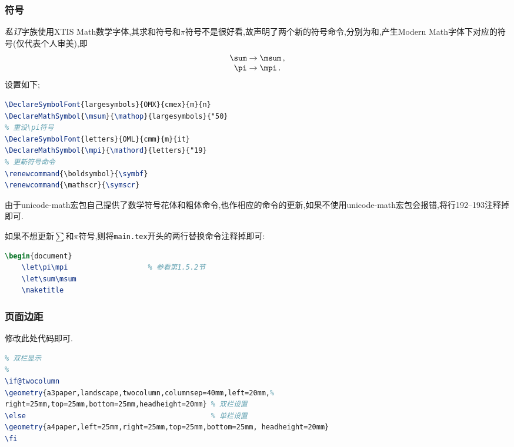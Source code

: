 \documentclass[list,answers,csize4,custom]{sysuexam}
\begin{document}
\subsubsection{符号}
\textit{私订}字族使用XTIS Math数学字体,其求和符号和$\pi$符号不是很好看,故声明了两个新的符号命令,分别为和,产生Modern Math字体下对应的符号(仅代表个人审美),即
$$
\begin{array}{c}
\sum \rightarrow \msum \,,\\
\pi  \rightarrow \mpi  \,.
\end{array}
$$
设置如下;

\begin{lstlisting}[title={\mt{sysuexam.cls}文件中\mt{\backslash{}msum}和\mt{\backslash{}mpi}}声明和更新命令,language=tex,firstnumber=185]
% 重设\sum符号
\DeclareSymbolFont{largesymbols}{OMX}{cmex}{m}{n}
\DeclareMathSymbol{\msum}{\mathop}{largesymbols}{"50}
% 重设\pi符号
\DeclareSymbolFont{letters}{OML}{cmm}{m}{it}
\DeclareMathSymbol{\mpi}{\mathord}{letters}{"19}
% 更新符号命令
\renewcommand{\boldsymbol}{\symbf}
\renewcommand{\mathscr}{\symscr}
\end{lstlisting}
由于unicode-math宏包自己提供了数学符号花体和粗体命令,也作相应的命令的更新,如果不使用unicode-math宏包会报错,将行192--193注释掉即可.

如果不想更新$\sum$和$\pi$符号,则将\texttt{main.tex}开头的两行替换命令注释掉即可:

\begin{lstlisting}[title={\mt{main.cls}文件中\mt{\backslash{}msum}和\mt{\backslash{}mpi}}更新命令,language=tex,firstnumber=20]
    \begin{document}
    \let\pi\mpi                   % 参看第1.5.2节
    \let\sum\msum
    \maketitle
\end{lstlisting}


\subsubsection{页面边距}
修改此处代码即可.
\begin{lstlisting}[title=页面边距设置,language=tex,firstnumber=271]
%
% 双栏显示
%
\if@twocolumn
\geometry{a3paper,landscape,twocolumn,columnsep=40mm,left=20mm,%
right=25mm,top=25mm,bottom=25mm,headheight=20mm} % 双栏设置
\else										     % 单栏设置
\geometry{a4paper,left=25mm,right=25mm,top=25mm,bottom=25mm, headheight=20mm}
\fi
\end{lstlisting}
\end{document}

